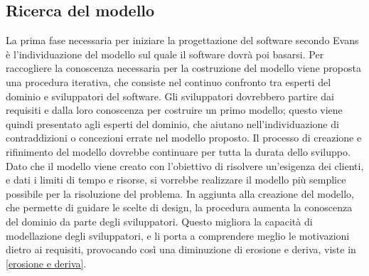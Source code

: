 \documentclass[a4paper,12pt]{report}
\begin{document}
\subsection{Ricerca del modello}
La prima fase necessaria per iniziare la progettazione del software secondo Evans è l'individuazione del modello sul quale il software dovrà poi basarsi. 
Per raccogliere la conoscenza necessaria per la costruzione del modello viene proposta una procedura iterativa, che consiste nel continuo confronto tra esperti del dominio e sviluppatori del software.
Gli sviluppatori dovrebbero partire dai requisiti e dalla loro conoscenza per costruire un primo modello; questo viene quindi presentato agli esperti del dominio, che aiutano nell'individuazione di contraddizioni o concezioni errate nel modello proposto.
Il processo di creazione e rifinimento del modello dovrebbe continuare per tutta la durata dello sviluppo. 
Dato che il modello viene creato con l'obiettivo di risolvere un'esigenza dei clienti, e dati i limiti di tempo e risorse, si vorrebbe realizzare il modello più semplice possibile per la risoluzione del problema.
In aggiunta alla creazione del modello, che permette di guidare le scelte di design, la procedura aumenta la conoscenza del dominio da parte degli sviluppatori.
Questo migliora la capacità di modellazione degli sviluppatori, e li porta a comprendere meglio le motivazioni dietro ai requisiti, provocando così una diminuzione di erosione e deriva, viste in \ref{erosione e deriva}.
\end{document}
